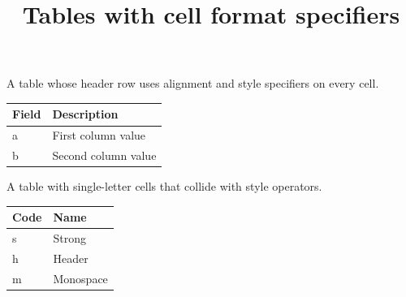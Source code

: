 \documentclass[11pt,a4paper]{article}
\title{Tables with cell format specifiers}
\begin{document}
\maketitle

A table whose header row uses alignment and style specifiers on every cell.

\begin{table}[h]
\begin{tabular}{|l|l|}
\hline
Field & Description \\ \hline
a & First column value \\ \hline
b & Second column value \\ \hline
\end{tabular}
\end{table}

A table with single-letter cells that collide with style operators.

\begin{table}[h]
\begin{tabular}{|l|l|}
\hline
Code & Name \\ \hline
s & Strong \\ \hline
h & Header \\ \hline
m & Monospace \\ \hline
\end{tabular}
\end{table}
\end{document}

